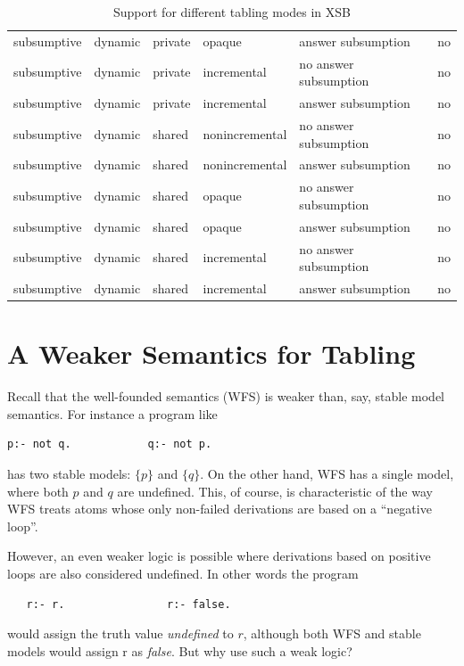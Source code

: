 \begin{table}
\begin{center}
{\begin{tabular}{llllll}
subsumptive &	    dynamic &	   private &	  opaque &	      answer subsumption &	no \\
subsumptive &	    dynamic &	   private &	  incremental &         no answer subsumption &	no \\
subsumptive &	    dynamic &	   private &   	  incremental &         answer subsumption &	no \\
subsumptive &	    dynamic &	   shared &	  nonincremental &      no answer subsumption &	no \\
subsumptive &	    dynamic &	   shared &	  nonincremental &      answer subsumption &	no \\
subsumptive &	    dynamic &	   shared &	  opaque &	      no answer subsumption &	no \\
subsumptive &	    dynamic &	   shared &	  opaque &	      answer subsumption &	no \\
subsumptive &	    dynamic &	   shared &	  incremental &         no answer subsumption &	no \\
subsumptive &  	    dynamic &	   shared &	  incremental &         answer subsumption &	no \\ \hline \hline 
\end{tabular}
}
\end{center}
\caption{Support for different tabling modes in XSB \version}
\label{table:table}
\end{table}

\section{A Weaker Semantics for Tabling}
%
Recall that the well-founded semantics (WFS) is weaker than, say,
stable model semantics.  For instance a program like
%
\begin{verbatim}
p:- not q.            q:- not p.
\end{verbatim}
%
has two stable models: $\{p\}$ and $\{q\}$.  On the other hand, WFS
has a single model, where both $p$ and $q$ are undefined.  This, of
course, is characteristic of the way WFS treats atoms whose only
non-failed derivations are based on a ``negative loop''.

However, an even weaker logic is possible where derivations based on
positive loops are also considered undefined.  In other words the
program
\begin{verbatim}
   r:- r.                r:- false.
\end{verbatim}
would assign the truth value {\em undefined} to $r$, although both WFS
and stable models would assign r as {\em false}.  But why use such a
weak logic?

